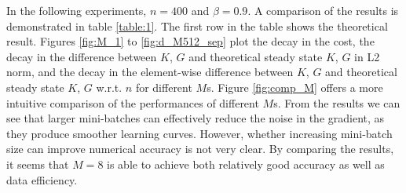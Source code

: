 \documentclass{article}
\begin{document}
\noindent In the following experiments, $n = 400$ and $\beta = 0.9$. A comparison of the results is demonstrated in table \ref{table:1}. The first row in the table shows the theoretical result. Figures \ref{fig:M_1} to \ref{fig:d_M512_sep} plot the decay in the cost, the decay in the difference between $K$, $G$ and theoretical steady state $K$, $G$ in L2 norm, and the decay in the element-wise difference between $K$, $G$ and theoretical steady state $K$, $G$ w.r.t. $n$ for different $M$s. Figure \ref{fig:comp_M} offers a more intuitive comparison of the performances of different $M$s. From the results we can see that larger mini-batches can effectively reduce the noise in the gradient, as they produce smoother learning curves. However, whether increasing mini-batch size can improve numerical accuracy is not very clear. By comparing the results, it seems that $M = 8$ is able to achieve both relatively good accuracy as well as data efficiency.\\
\end{document}
